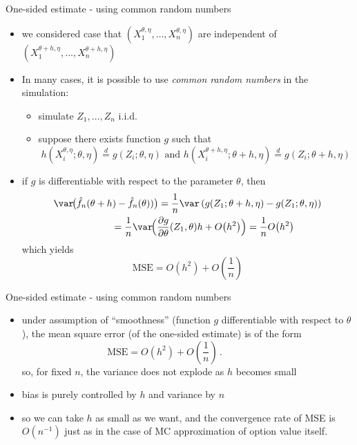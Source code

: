 \documentclass[pdf, handout]{beamer}
\begin{document}
\begin{frame}{One-sided estimate - using common random numbers}
\begin{itemize}
\item we considered case that $(X_1^{\theta,\eta},\dots,X_n^{\theta,\eta})$ are independent of
$(X_1^{\theta+h,\eta},\dots,X_n^{\theta+h,\eta})$
\item In many cases, it is possible to use \emph{common random numbers} in the simulation: 
\begin{itemize}
\item simulate $Z_1,\dots,Z_n$ i.i.d.
\item suppose there exists function $g$ such that
\[
h(X_i^{\theta,\eta};\theta,\eta) 
\stackrel{d}{=} g(Z_i;\theta,\eta) \text{ and }
h(X_i^{\theta+h,\eta};\theta+h,\eta)\stackrel{d}{=} g(Z_i;\theta+h,\eta)
\]
\end{itemize}
\item if $g$ is differentiable with respect to the parameter $\theta$,
then
\begin{align*}
\var\!\big(
\hat f_n(\theta+h) -  \hat f_n(\theta)
)\big)= \frac{1}{n}\var\left(
g(Z_1;\theta+h,\eta) - g(Z_1;\theta,\eta)
\right)
 \\
= \frac{1}{n}  \var\!\Big( \frac{\partial g}{\partial \theta} (Z_1,\theta)h + O\big(h^2\big)\Big)
= \frac{1}{n}O\big(h^2\big) \hspace{1cm}
\end{align*}
which yields 
\[
\text{MSE} = O( h^2 ) + O(  \frac{1}{n})
\]
\end{itemize}
\end{frame}

\begin{frame}{One-sided estimate - using common random numbers}
\begin{itemize}
\item under  assumption of ``smoothness''
(function $g$ differentiable with respect to $\theta$), the mean square error (of the one-sided estimate)
is of the form  
$$
\text{MSE} = O( h^2) + O\left(\frac{1}{n}\right)\,. \hspace{2cm}
$$
so, for fixed $n$, the variance does not explode as $h$ becomes small
\item 
bias is purely controlled by $h$ and variance by $n$ 
\item so we can take
$h$ as small as we want, and the convergence
rate of MSE is $O(n^{-1})$ just as in the case of MC approximation of option value itself.
\end{itemize}
\end{frame}
\end{document}
